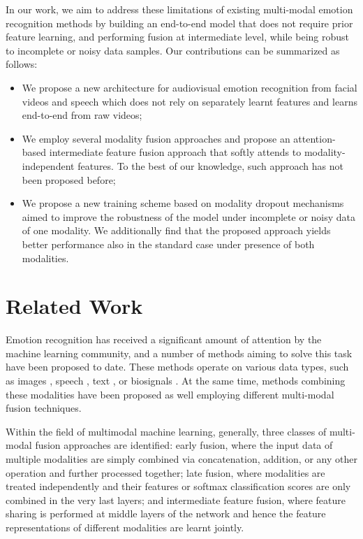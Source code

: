 \documentclass[a4paper,conference]{IEEEtran}
\begin{document}
In our work, we aim to address these limitations of existing multi-modal emotion recognition methods by building an end-to-end model that does not require prior feature learning, and performing fusion at intermediate level, while being robust to incomplete or noisy data samples. Our contributions can be summarized as follows: 
\begin{itemize}
    \item We propose a new architecture for audiovisual emotion recognition from facial videos and speech which does not rely on separately learnt features and learns end-to-end from raw videos;
    
    \item We employ several modality fusion approaches and propose an attention-based intermediate feature fusion approach that softly attends to modality-independent features. To the best of our knowledge, such approach has not been proposed before;
    
    \item We propose a new training scheme based on modality dropout mechanisms aimed to improve the robustness of the model under incomplete or noisy data of one modality. We additionally find that the proposed approach yields better performance also in the standard case under presence of both modalities. 
\end{itemize}


\section{Related Work}

Emotion recognition has received a significant amount of attention by the machine learning community, and a number of methods aiming to solve this task have been proposed to date. These methods operate on various data types, such as images \cite{efficientface}, speech \cite{khalil2019speech}, text \cite{soleymani2017survey}, or biosignals \cite{shu2018review}. At the same time, methods combining these modalities have been proposed as well \cite{mult, icasspav, interspeech} employing different multi-modal fusion techniques.

Within the field of multimodal machine learning, generally, three classes of multi-modal fusion approaches are identified: early fusion, where the input data of multiple modalities are simply combined via concatenation, addition, or any other operation and further processed together; late fusion, where modalities are treated independently and their features or softmax classification scores are only combined in the very last layers; and intermediate feature fusion, where feature sharing is performed at middle layers of the network and hence the feature representations of different modalities are learnt jointly. 
\end{document}
